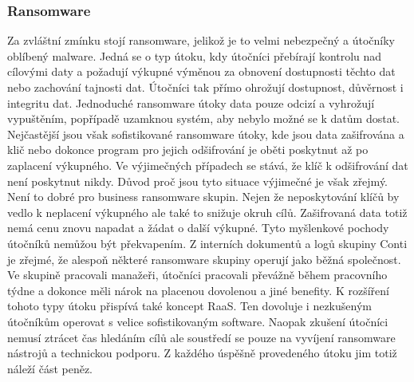 \subsubsection{Ransomware}
Za zvláštní zmínku stojí ransomware, jelikož je to velmi nebezpečný a útočníky oblíbený malware.
Jedná se o typ útoku, kdy útočníci přebírají kontrolu nad cílovými daty a požadují výkupné výměnou za obnovení dostupnosti těchto dat nebo zachování tajnosti dat.
Útočníci tak přímo ohrožují dostupnost, důvěrnost i integritu dat.
Jednoduché ransomware útoky data pouze odcizí a vyhrožují vypuštěním, popřípadě uzamknou systém, aby nebylo možné se k datům dostat.
Nejčastější jsou však sofistikované ransomware útoky, kde jsou data zašifrována a klič nebo dokonce program pro jejich odšifrování je oběti poskytnut až po zaplacení výkupného.
Ve výjimečných případech se stává, že klíč k odšifrování dat není poskytnut nikdy.
Důvod proč jsou tyto situace výjimečné je však zřejmý.
Není to dobré pro business ransomware skupin.
Nejen že neposkytování klíčů by vedlo k neplacení výkupného ale také to snižuje okruh cílů.
Zašifrovaná data totiž nemá cenu znovu napadat a žádat o další výkupné.
Tyto myšlenkové pochody útočníků nemůžou být překvapením.
Z interních dokumentů a logů skupiny Conti je zřejmé, že alespoň některé ransomware skupiny operují jako běžná společnost\cite{Conti_logs}.
Ve skupině pracovali manažeři, útočníci pracovali převážně během pracovního týdne a dokonce měli nárok na placenou dovolenou a jiné benefity.
K rozšíření tohoto typy útoku přispívá také koncept \ac{RaaS}.
Ten dovoluje i nezkušeným útočníkům operovat s velice sofistikovaným software.
Naopak zkušení útočníci nemusí ztrácet čas hledáním cílů ale soustředí se pouze na vyvíjení ransomware nástrojů a technickou podporu.
Z každého úspěšně provedeného útoku jim totiž náleží část peněz.\cite{Enisa_thread_landscape}


